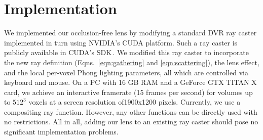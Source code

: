 \section{Implementation}
\label{sec:implem}
%
We implemented our occlusion-free lens by modifying a standard DVR ray caster implemented in turn using NVIDIA's CUDA platform. Such a ray caster is publicly available in CUDA's SDK\,\cite{cudasdk}. We modified this ray caster to incorporate the new ray definition (Eqns.~\ref{eqn:gathering} and \ref{eqn:scattering}), the lens effect, and the local per-voxel Phong lighting parameters, all which are controlled via keyboard and mouse. On a PC with 16 GB RAM and a GeForce GTX TITAN X card, we achieve an interactive framerate (15 frames per second) for volumes up to $512^3$ voxels at a screen resolution of1900x1200 pixels. Currently, we use a compositing ray function. However, any other functions can be directly used with no restrictions. All in all, adding our lens to an existing ray caster should pose no significant implementation problems.

